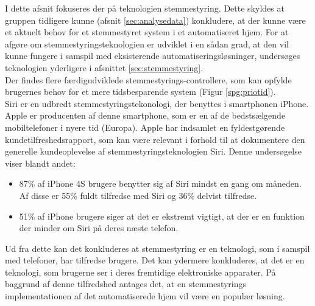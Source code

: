\label{sec:infosearch}
I dette afsnit fokuseres der på teknologien stemmestyring. Dette skyldes at gruppen tidligere kunne (afsnit \ref{sec:analysedata}) konkludere, at der kunne være et aktuelt behov for et stemmestyret system i et automatiseret hjem. For at afgøre om stemmestyringsteknologien er udviklet i en sådan grad, at den vil kunne fungere i samspil med eksisterende automatiseringsløsninger, undersøges teknologien yderligere i afsnittet \ref{sec:stemmestyring}. \\

Der findes flere færdigudviklede stemmestyrings-controllere, som kan opfylde brugernes behov for et mere tidsbesparende system (Figur \ref{spg:priotid}). \\
Siri er en udbredt stemmestyringstekonologi, der benyttes i smartphonen iPhone. Apple er producenten af denne smartphone, som er en af de bedstsælgende mobiltelefoner i nyere tid (Europa).\cite{IDCIphone} Apple har indsamlet en fyldestgørende kundetilfreshedsrapport, som kan være relevant i forhold til at dokumentere den generelle kundeoplevelse af stemmestyringsteknologien Siri. Denne undersøgelse viser blandt andet:
\begin{itemize}
    \item 87\% af iPhone 4S brugere benytter sig af Siri mindst en gang om måneden. Af disse er 55\% fuldt tilfredse med Siri og 36\% delvist tilfredse.
    \item 51\% af iPhone brugere siger at det er ekstremt vigtigt, at der er en funktion der minder om Siri på deres næste telefon\cite{SiriUsage}.
\end{itemize}
Ud fra dette kan det konkluderes at stemmestyring er en teknologi, som i samspil med telefoner, har tilfredse brugere. Det kan ydermere konkluderes, at det er en teknologi, som brugerne ser i deres fremtidige elektroniske apparater. På baggrund af denne tilfredshed antages det, at en stemmestyrings implementationen af det automatiserede hjem vil være en populær løsning.
